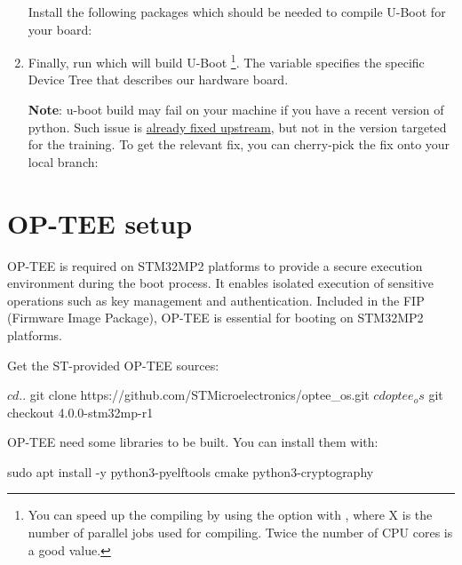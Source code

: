 \begin{enumerate}
Install the following packages which should be needed to compile
U-Boot for your board:


\item Finally, run  which
  will build U-Boot
  \footnote{You can speed up the
  compiling by using the  option with , where X
  is the number of parallel jobs used for compiling. Twice the
  number of CPU cores is a good value.}.
  The  variable specifies the specific
  Device Tree that describes our hardware board.

{\bf Note}: u-boot build may fail on your machine if you have a recent
version of python. Such issue is
\href{https://source.denx.de/u-boot/u-boot/-/commit/a63456b9191fae2fe49f4b121e025792022e3950}{already
fixed upstream}, but not in the version targeted for the training. To get the relevant fix,
you can cherry-pick the fix onto your local branch:

\end{enumerate}

\section{OP-TEE setup}

OP-TEE is required on STM32MP2 platforms to provide a secure execution
environment during the boot process. It enables isolated execution of
sensitive operations such as key management and authentication.
Included in the FIP (Firmware Image Package), OP-TEE is essential for
booting on STM32MP2 platforms.

Get the ST-provided OP-TEE sources:

\begin{bashinput}
$ cd ..
$ git clone https://github.com/STMicroelectronics/optee_os.git
$ cd optee_os
$ git checkout 4.0.0-stm32mp-r1
\end{bashinput}

OP-TEE need some libraries to be built. You can install them with:
\begin{bashinput}
sudo apt install -y python3-pyelftools cmake python3-cryptography
\end{bashinput}

